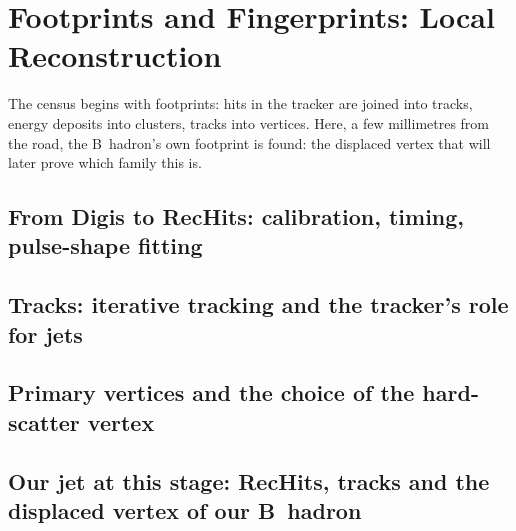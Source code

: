 \chapter{Footprints and Fingerprints: Local Reconstruction}
\label{ch:footprints}

\begin{journeybox}
The census begins with footprints: hits in the tracker are joined into tracks,
energy deposits into clusters, tracks into vertices. Here, a few millimetres
from the road, the B~hadron's own footprint is found: the displaced vertex that
will later prove which family this is.
\end{journeybox}


\section{From Digis to RecHits: calibration, timing, pulse-shape fitting}
\label{sec:footprints:from_digis_to_rechits_calibration_timing}

\section{Tracks: iterative tracking and the tracker's role for jets}
\label{sec:footprints:tracks_iterative_tracking_and_the_tracke}

\section{Primary vertices and the choice of the hard-scatter vertex}
\label{sec:footprints:primary_vertices_and_the_choice_of_the_h}

\section{Our jet at this stage: RecHits, tracks and the displaced vertex of our B~hadron}
\label{sec:footprints:our_jet_at_this_stage_rechits_tracks_and}

